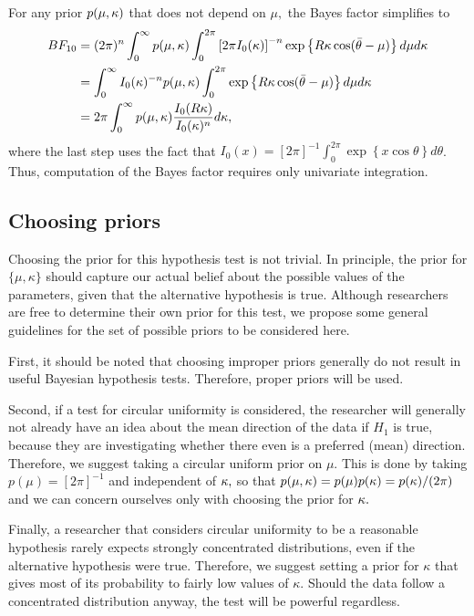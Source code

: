 For any prior \( p(\mu, \kappa) \) that does not depend on \( \mu, \) the Bayes factor simplifies to
\begin{align}
BF_{10} %
&= (2 \pi)^n \int_0^{\infty} p(\mu, \kp) \int_0^{2\pi} \left[ 2 \pi I_0 (\kappa) \right]^{-n} \exp \left\{ R \kappa \cos (\bar{\theta} - \mu) \right\} d\mu d\kappa \\
&= \int_0^{\infty} I_0 (\kappa)^{-n} p(\mu, \kp) \int_0^{2\pi}  \exp \left\{ R \kappa \cos (\bar{\theta} - \mu) \right\} d\mu d\kappa \\
&= 2 \pi \int_0^{\infty}  p(\mu, \kp) \frac{I_0(R \kp)}{I_0 (\kappa)^n} d\kappa,
\end{align}
where the last step uses the fact that \( I_0(x) = [2 \pi]^{-1} \int_0^{2\pi} \exp\left\{ x \cos \theta \right\} d\theta\). Thus, computation of the Bayes factor requires only univariate integration.

\subsection{Choosing priors}
\label{sub:Priors}

Choosing the prior for this hypothesis test is not trivial. In principle, the prior for \( \{ \mu, \kappa \} \) should capture our actual belief about the possible values of the parameters, given that the alternative hypothesis is true. Although researchers are free to determine their own prior for this test, we propose some general guidelines for the set of possible priors to be considered here. 

First, it should be noted that choosing improper priors generally do not result in useful Bayesian hypothesis tests. Therefore, proper priors will be used.

Second, if a test for circular uniformity is considered, the researcher will generally not already have an idea about the mean direction of the data if \( H_1 \) is true, because they are investigating whether there even is a preferred (mean) direction. Therefore, we suggest taking a circular uniform prior on \( \mu \). This is done by taking \( p(\mu) = [2 \pi]^{-1} \) and independent of \( \kappa, \) so that \( p(\mu, \kappa) = p(\mu) p(\kappa) = p(\kappa)/ (2\pi) \) and we can concern ourselves only with choosing the prior for \( \kappa.\)

Finally, a researcher that considers circular uniformity to be a reasonable hypothesis rarely expects strongly concentrated distributions, even if the alternative hypothesis were true. Therefore, we suggest setting a prior for \( \kappa \) that gives most of its probability to fairly low values of \( \kappa \). Should the data follow a concentrated distribution anyway, the test will be powerful regardless.  

